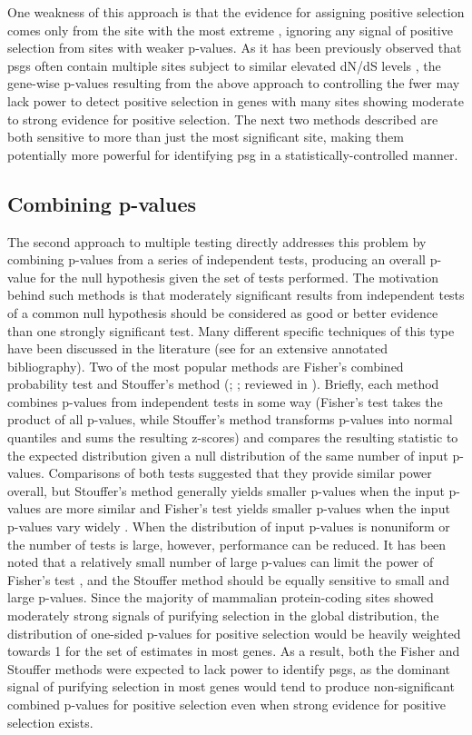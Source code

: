 One weakness of this approach is that the evidence for assigning
positive selection comes only from the site with the most extreme
\slrt, ignoring any signal of positive selection from sites with
weaker p-values. As it has been previously observed that \acp{psg}
often contain multiple sites subject to similar elevated dN/dS levels
\citep{Sawyer2005a,Kosiol2008}, the gene-wise p-values resulting from
the above approach to controlling the \ac{fwer} may lack power to
detect positive selection in genes with many sites showing moderate to
strong evidence for positive selection. The next two methods described
are both sensitive to more than just the most significant site, making
them potentially more powerful for identifying \ac{psg} in a
statistically-controlled manner.

\subsection{Combining p-values}

The second approach to multiple testing directly addresses this
problem by combining p-values from a series of independent tests,
producing an overall p-value for the null hypothesis given the set of
tests performed. The motivation behind such methods is that moderately
significant results from independent tests of a common null hypothesis
should be considered as good or better evidence than one strongly
significant test. Many different specific techniques of this type have
been discussed in the literature (see \citet{Cousins2007} for an
extensive annotated bibliography). Two of the most popular methods are
Fisher's combined probability test and Stouffer's method
(\citealp{Fisher1932}; \citealp{Stouffer1949}; reviewed in
\citealp{Whitlock2005}). Briefly, each method combines p-values from
independent tests in some way (Fisher's test takes the product of all
p-values, while Stouffer's method transforms p-values into normal
quantiles and sums the resulting z-scores) and compares the resulting
statistic to the expected distribution given a null distribution of
the same number of input p-values. Comparisons of both tests suggested
that they provide similar power overall, but Stouffer's method
generally yields smaller p-values when the input p-values are more
similar and Fisher's test yields smaller p-values when the input
p-values vary widely \citep{Darlington2000}. When the distribution of
input p-values is nonuniform or the number of tests is large, however,
performance can be reduced. It has been noted that a relatively small
number of large p-values can limit the power of Fisher's test
\citep{Zaykin2002}, and the Stouffer method should be equally
sensitive to small and large p-values. Since the majority of mammalian
protein-coding sites showed moderately strong signals of purifying
selection in the global distribution, the distribution of one-sided
p-values for positive selection would be heavily weighted towards 1
for the set of \sw estimates in most genes. As a result, both the
Fisher and Stouffer methods were expected to lack power to identify
\acp{psg}, as the dominant signal of purifying selection in most genes
would tend to produce non-significant combined p-values for positive
selection even when strong evidence for positive selection exists.

